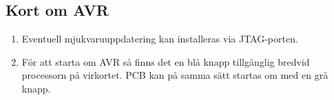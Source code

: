 \subsection{Kort om AVR}
\begin{enumerate}
	\item Eventuell mjukvaruuppdatering kan installeras via JTAG-porten.
	\item För att starta om AVR så finns det en blå knapp tillgänglig bredvid processorn på virkortet. PCB kan på samma sätt startas om med en grå knapp.
\end{enumerate}
